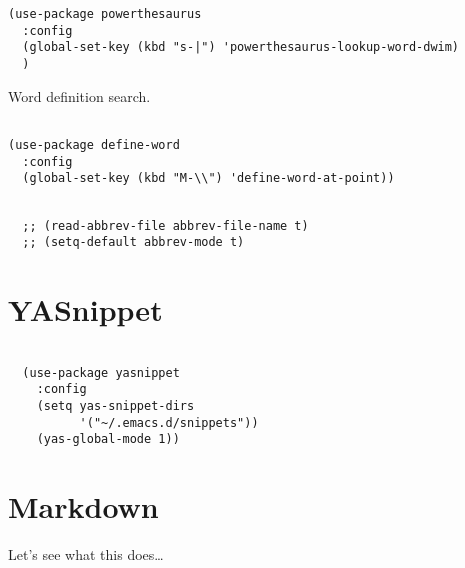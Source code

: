 \documentclass[11pt]{article}
\begin{document}
\begin{verbatim}
(use-package powerthesaurus
  :config
  (global-set-key (kbd "s-|") 'powerthesaurus-lookup-word-dwim)
  )
\end{verbatim}

Word definition search.

\begin{verbatim}

(use-package define-word
  :config
  (global-set-key (kbd "M-\\") 'define-word-at-point))

\end{verbatim}

\begin{verbatim}

  ;; (read-abbrev-file abbrev-file-name t)
  ;; (setq-default abbrev-mode t)

\end{verbatim}

\section{YASnippet}
\label{sec:orgd24f4d3}

\begin{verbatim}

  (use-package yasnippet
    :config
    (setq yas-snippet-dirs
          '("~/.emacs.d/snippets"))
    (yas-global-mode 1))

\end{verbatim}

\section{Markdown}
\label{sec:org8887cba}
Let's see what this does\ldots{}
\end{document}
